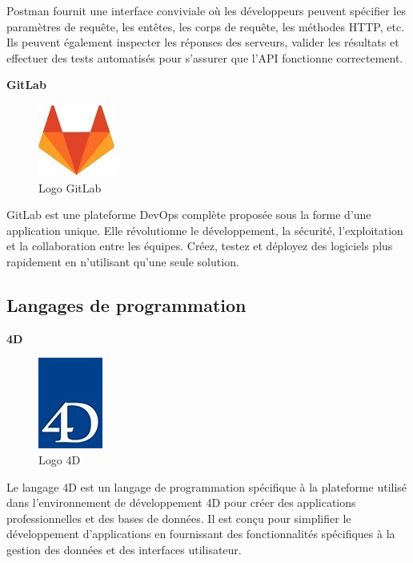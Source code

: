 Postman fournit une interface conviviale où les développeurs 
peuvent spécifier les paramètres de requête, les entêtes, 
les corps de requête, les méthodes HTTP, etc. Ils peuvent 
également inspecter les réponses des serveurs, valider les 
résultats et effectuer des tests automatisés pour s’assurer que 
l’API fonctionne correctement. 
\newline

\large 
\textbf{GitLab}

\begin{figure}[htbp]
   \centering
   \includegraphics[scale=0.6]{Images/gitlab.jpg} 
   \caption{Logo GitLab}
   \label{fig:gitlab}
\end{figure}
GitLab est une plateforme DevOps complète proposée sous la forme 
d’une application unique. Elle révolutionne le développement, 
la sécurité, l’exploitation et la collaboration entre les équipes. 
Créez, testez et déployez des logiciels plus rapidement en 
n’utilisant qu’une seule solution. 

\subsection{Langages de programmation}
\large 
\textbf{4D}

\begin{figure}[htbp]
   \centering
   \includegraphics[scale=0.8]{Images/logo-4d.jpg} 
   \caption{Logo 4D}
   \label{fig:4D}
\end{figure}
Le langage 4D est un langage de programmation spécifique à la
 plateforme utilisé dans l’environnement de développement 4D pour
  créer des applications professionnelles et des bases de données. 
  Il est conçu pour simplifier le développement d’applications 
  en fournissant des fonctionnalités spécifiques à la gestion des 
  données et des interfaces utilisateur.
\newline

